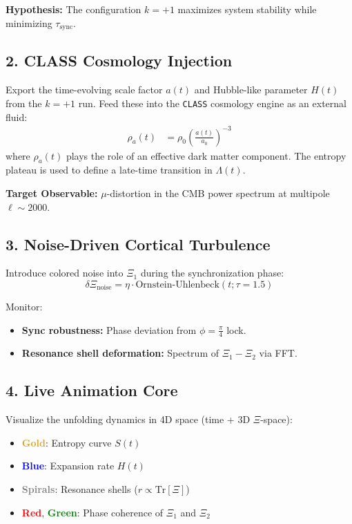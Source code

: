 \documentclass[12pt]{article}
\theoremstyle{plain}
\begin{document}
\textbf{Hypothesis:} The configuration $k = +1$ maximizes system stability while minimizing $\tau_{\text{sync}}$.

\subsection*{2. CLASS Cosmology Injection}

Export the time-evolving scale factor $a(t)$ and Hubble-like parameter $H(t)$ from the $k = +1$ run. Feed these into the \texttt{CLASS} cosmology engine as an external fluid:
\begin{align}
\rho_a(t) &= \rho_0 \left( \frac{a(t)}{a_0} \right)^{-3}
\end{align}
where $\rho_a(t)$ plays the role of an effective dark matter component. The entropy plateau is used to define a late-time transition in $\Lambda(t)$.

\textbf{Target Observable:} $\mu$-distortion in the CMB power spectrum at multipole $\ell \sim 2000$.

\subsection*{3. Noise-Driven Cortical Turbulence}

Introduce colored noise into $\Xi_1$ during the synchronization phase:
\begin{equation}
\delta \Xi_{\text{noise}} = \eta \cdot \text{Ornstein-Uhlenbeck}(t; \tau = 1.5)
\end{equation}

Monitor:
\begin{itemize}
    \item \textbf{Sync robustness:} Phase deviation from $\phi = \frac{\pi}{4}$ lock.
    \item \textbf{Resonance shell deformation:} Spectrum of $\Xi_1 - \Xi_2$ via FFT.
\end{itemize}

\subsection*{4. Live Animation Core}

Visualize the unfolding dynamics in 4D space (time + 3D $\Xi$-space):
\begin{itemize}
    \item \textcolor{Goldenrod}{\textbf{Gold}}: Entropy curve $S(t)$
    \item \textcolor{Blue}{\textbf{Blue}}: Expansion rate $H(t)$
    \item \textcolor{Gray}{\textbf{Spirals}}: Resonance shells ($r \propto \mathrm{Tr}[\Xi]$)
    \item \textcolor{Red}{\textbf{Red}}, \textcolor{Green}{\textbf{Green}}: Phase coherence of $\Xi_1$ and $\Xi_2$
\end{itemize}
\end{document}
